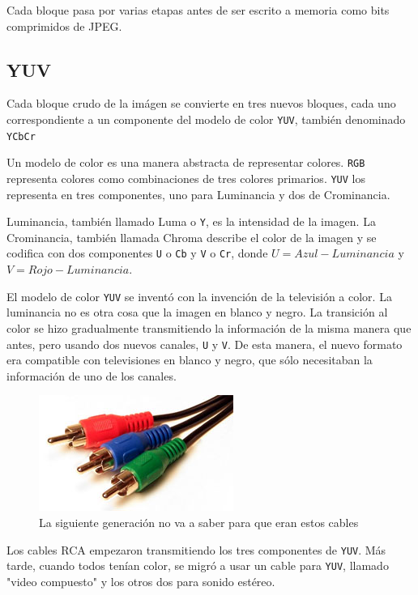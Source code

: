 Cada bloque pasa por varias etapas antes de ser escrito a memoria como bits
comprimidos de JPEG.


\subsection{YUV}\label{sub:yuv}

Cada bloque crudo de la imágen se convierte en tres nuevos bloques, cada uno
correspondiente a un componente del modelo de color \verb+YUV+, también
denominado \verb+YCbCr+

Un modelo de color es una manera abstracta de representar colores. \verb+RGB+
representa colores como combinaciones de tres colores primarios. \verb+YUV+ los
representa en tres componentes, uno para Luminancia y dos de Crominancia.

Luminancia, también llamado Luma o \verb+Y+, es la intensidad de la imagen. La
Crominancia, también llamada Chroma describe el color de la imagen y se
codifica con dos componentes \verb+U+ o \verb+Cb+ y \verb+V+ o \verb+Cr+, donde
$U = Azul - Luminancia$ y $V = Rojo - Luminancia$.

El modelo de color \verb+YUV+ se inventó con la invención de la televisión a
color. La luminancia no es otra cosa que la imagen en blanco y negro. La
transición al color se hizo gradualmente transmitiendo la información de la
misma manera que antes, pero usando dos nuevos canales, \verb+U+ y \verb+V+. De
esta manera, el nuevo formato era compatible con televisiones en blanco y
negro, que sólo necesitaban la información de uno de los canales.

\begin{figure}[hb]
\includegraphics{yuv_cable}
    \caption{La siguiente generación no va a saber para que eran estos cables}
\end{figure}

Los cables RCA empezaron transmitiendo los tres componentes de \verb+YUV+. Más
tarde, cuando todos tenían color, se migró a usar un cable para \verb+YUV+,
llamado "video compuesto" y los otros dos para sonido estéreo.

